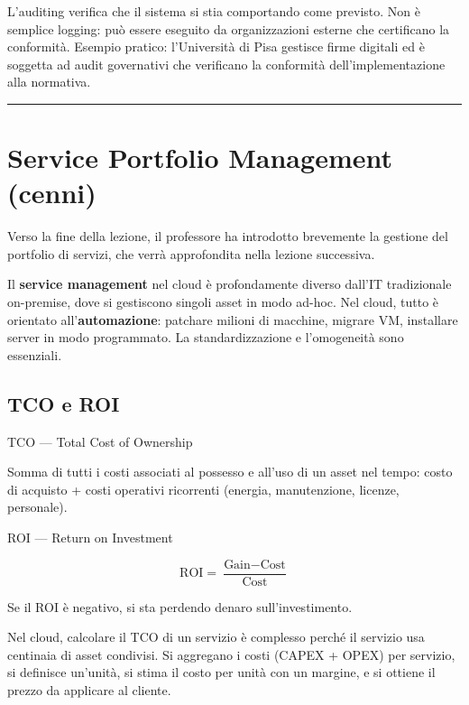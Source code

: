\documentclass[
  italian,
  openany]{book}
\begin{document}
L'auditing verifica che il sistema si stia comportando come previsto.
Non è semplice logging: può essere eseguito da organizzazioni esterne
che certificano la conformità. Esempio pratico: l'Università di Pisa
gestisce firme digitali ed è soggetta ad audit governativi che
verificano la conformità dell'implementazione alla normativa.

\begin{center}\rule{0.5\linewidth}{0.5pt}\end{center}

\section{Service Portfolio Management
(cenni)}\label{service-portfolio-management-cenni}

Verso la fine della lezione, il professore ha introdotto brevemente la
gestione del portfolio di servizi, che verrà approfondita nella lezione
successiva.

Il \textbf{service management} nel cloud è profondamente diverso dall'IT
tradizionale on-premise, dove si gestiscono singoli asset in modo
ad-hoc. Nel cloud, tutto è orientato all'\textbf{automazione}: patchare
milioni di macchine, migrare VM, installare server in modo programmato.
La standardizzazione e l'omogeneità sono essenziali.

\subsection{TCO e ROI}\label{tco-e-roi}

\begin{calloutdefinition}{TCO — Total Cost of Ownership}

Somma di tutti i costi associati al possesso e all'uso di un asset nel
tempo: costo di acquisto + costi operativi ricorrenti (energia,
manutenzione, licenze, personale).

\end{calloutdefinition}

\begin{calloutdefinition}{ROI — Return on Investment}

\[\text{ROI} = \frac{\text{Gain} - \text{Cost}}{\text{Cost}}\]

Se il ROI è negativo, si sta perdendo denaro sull'investimento.

\end{calloutdefinition}

Nel cloud, calcolare il TCO di un servizio è complesso perché il
servizio usa centinaia di asset condivisi. Si aggregano i costi (CAPEX +
OPEX) per servizio, si definisce un'unità, si stima il costo per unità
con un margine, e si ottiene il prezzo da applicare al cliente.
\end{document}
